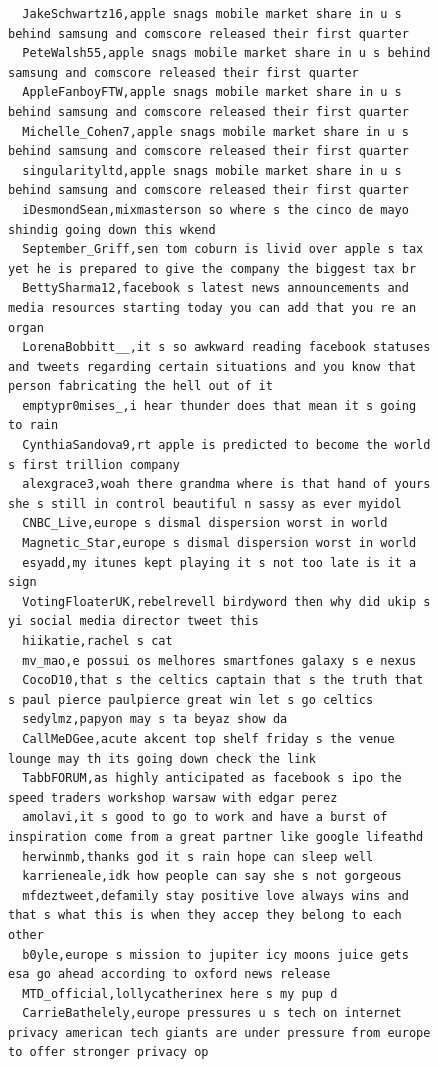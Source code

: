 \begin{figure}[htpb]
\begin{verbatim}
  JakeSchwartz16,apple snags mobile market share in u s behind samsung and comscore released their first quarter
  PeteWalsh55,apple snags mobile market share in u s behind samsung and comscore released their first quarter
  AppleFanboyFTW,apple snags mobile market share in u s behind samsung and comscore released their first quarter
  Michelle_Cohen7,apple snags mobile market share in u s behind samsung and comscore released their first quarter
  singularityltd,apple snags mobile market share in u s behind samsung and comscore released their first quarter
  iDesmondSean,mixmasterson so where s the cinco de mayo shindig going down this wkend
  September_Griff,sen tom coburn is livid over apple s tax yet he is prepared to give the company the biggest tax br
  BettySharma12,facebook s latest news announcements and media resources starting today you can add that you re an organ
  LorenaBobbitt__,it s so awkward reading facebook statuses and tweets regarding certain situations and you know that person fabricating the hell out of it
  emptypr0mises_,i hear thunder does that mean it s going to rain
  CynthiaSandova9,rt apple is predicted to become the world s first trillion company
  alexgrace3,woah there grandma where is that hand of yours she s still in control beautiful n sassy as ever myidol
  CNBC_Live,europe s dismal dispersion worst in world
  Magnetic_Star,europe s dismal dispersion worst in world
  esyadd,my itunes kept playing it s not too late is it a sign
  VotingFloaterUK,rebelrevell birdyword then why did ukip s yi social media director tweet this
  hiikatie,rachel s cat
  mv_mao,e possui os melhores smartfones galaxy s e nexus
  CocoD10,that s the celtics captain that s the truth that s paul pierce paulpierce great win let s go celtics
  sedylmz,papyon may s ta beyaz show da
  CallMeDGee,acute akcent top shelf friday s the venue lounge may th its going down check the link
  TabbFORUM,as highly anticipated as facebook s ipo the speed traders workshop warsaw with edgar perez
  amolavi,it s good to go to work and have a burst of inspiration come from a great partner like google lifeathd
  herwinmb,thanks god it s rain hope can sleep well
  karrieneale,idk how people can say she s not gorgeous
  mfdeztweet,defamily stay positive love always wins and that s what this is when they accep they belong to each other
  b0yle,europe s mission to jupiter icy moons juice gets esa go ahead according to oxford news release
  MTD_official,lollycatherinex here s my pup d
  CarrieBathelely,europe pressures u s tech on internet privacy american tech giants are under pressure from europe to offer stronger privacy op

\end{verbatim}
\end{figure}
